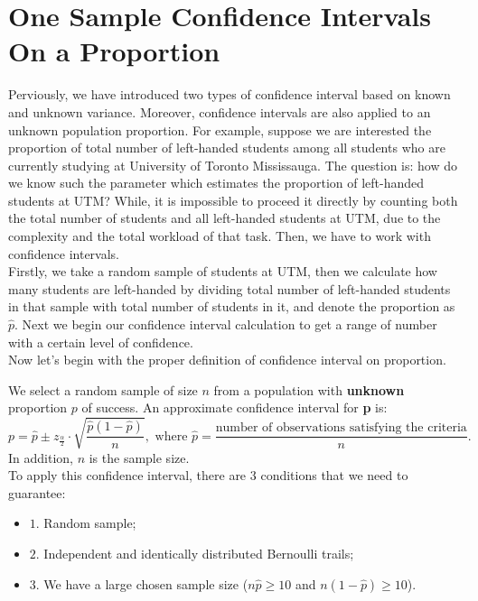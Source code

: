 \setcounter{chapter}{7}
\chapter{One Sample Confidence Intervals On a Proportion}
\label{sec.matrix}
\pagestyle{myheadings}  

Perviously, we have introduced two types of confidence interval based on known and unknown variance. Moreover, confidence intervals are also applied to an unknown population proportion. For example, suppose we are interested the proportion of total number of left-handed students among all students who are currently studying at University of Toronto Mississauga. The question is: how do we know such the parameter which estimates the proportion of left-handed students at UTM? While, it is impossible to proceed it directly by counting both the total number of students and all left-handed students at UTM, due to the complexity and the total workload of that task. Then, we have to work with confidence intervals.\\

\noindent
Firstly, we take a random sample of students at UTM, then we calculate how many students are left-handed by dividing total number of left-handed students in that sample with total number of students in it, and denote the proportion as $\hat{p}$. Next we begin our confidence interval calculation to get a range of number with a certain level of confidence.\\

\noindent
Now let's begin with the proper definition of confidence interval on proportion.

\begin{definition}
We select a random sample of size $n$ from a population with \textbf{unknown} proportion $p$ of success. An approximate confidence interval for \textbf{p} is: \[ p = \hat{p}  \pm z_{\frac{\alpha}{2}} \cdot \sqrt{\frac{\hat{p}(1 - \hat{p})}{n}}, \text{ where $\hat{p} = \frac{\text{number of observations satisfying the criteria}}{n}$.}\]
In addition, $n$ is the sample size.\\
To apply this confidence interval, there are $3$ conditions that we need to guarantee:
\begin{itemize}
	\item $1$. Random sample;
	\item $2$. Independent and identically distributed Bernoulli trails;
	\item $3$. We have a large chosen sample size ($n\hat{p} \ge 10$ and $n(1-\hat{p}) \ge 10$).
\end{itemize}
\end{definition}

